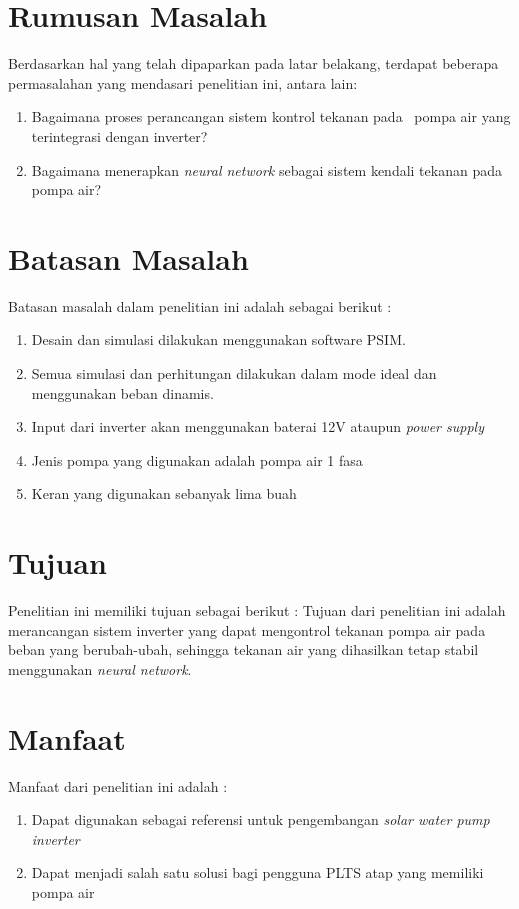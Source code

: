 \par\vspace{1.2cm}
\section{Rumusan Masalah}
\label{sec:Rumusan Masalah}

Berdasarkan hal yang telah dipaparkan pada latar belakang, terdapat beberapa permasalahan 
yang mendasari penelitian ini, antara lain: 
\begin{enumerate}
  \item Bagaimana proses perancangan sistem kontrol tekanan pada \
  pompa air yang terintegrasi dengan inverter?
  \item Bagaimana menerapkan \emph{neural network} sebagai sistem kendali 
  tekanan pada pompa air?
\end{enumerate}

\section{Batasan Masalah}
\label{sec:batasanmasalah}

Batasan masalah dalam penelitian ini adalah sebagai berikut : 
\begin {enumerate}
  \item Desain dan simulasi dilakukan menggunakan software PSIM.
  \item Semua simulasi dan perhitungan dilakukan dalam mode ideal dan menggunakan beban dinamis. 
  \item Input dari inverter akan menggunakan baterai 12V ataupun \emph{power supply}
  \item Jenis pompa yang digunakan adalah pompa air 1 fasa
  \item Keran yang digunakan sebanyak lima buah
\end{enumerate}


\section{Tujuan}
\label{sec:Tujuan}

Penelitian ini memiliki tujuan sebagai berikut : 
	Tujuan dari penelitian ini adalah merancangan sistem inverter yang dapat 
  mengontrol tekanan pompa air pada beban yang berubah-ubah, sehingga tekanan 
  air yang dihasilkan tetap stabil menggunakan \emph{neural network}.

\section{Manfaat}
Manfaat dari penelitian ini adalah :
\begin{enumerate}
    \item Dapat digunakan sebagai referensi untuk pengembangan 
    \textit{solar water pump inverter}
    \item Dapat menjadi salah satu solusi bagi pengguna PLTS atap yang memiliki pompa air
\end{enumerate}